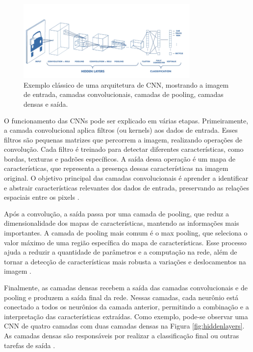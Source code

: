 \begin{figure}[b!]
    \centering   
    \includegraphics[width=0.8\textwidth]{fig/CNNExample.png}
    \caption{Exemplo clássico de uma arquitetura de CNN, mostrando a imagem de entrada, camadas convolucionais, camadas de pooling, camadas densas e saída.}
    \label{fig:cnnexample}
\end{figure} %


O funcionamento das CNNs pode ser explicado em várias etapas. Primeiramente, a camada convolucional aplica filtros (ou kernels) aos dados de entrada. Esses filtros são pequenas matrizes que percorrem a imagem, realizando operações de convolução. Cada filtro é treinado para detectar diferentes características, como bordas, texturas e padrões específicos. A saída dessa operação é um mapa de características, que representa a presença dessas características na imagem original. O objetivo principal das camadas convolucionais é aprender a identificar e abstrair características relevantes dos dados de entrada, preservando as relações espaciais entre os pixels \cite{aggarwal2018neural}.

Após a convolução, a saída passa por uma camada de pooling, que reduz a dimensionalidade dos mapas de características, mantendo as informações mais importantes. A camada de pooling mais comum é o max pooling, que seleciona o valor máximo de uma região específica do mapa de características. Esse processo ajuda a reduzir a quantidade de parâmetros e a computação na rede, além de tornar a detecção de características mais robusta a variações e deslocamentos na imagem \cite{aggarwal2018neural}.

Finalmente, as camadas densas recebem a saída das camadas convolucionais e de pooling e produzem a saída final da rede. Nessas camadas, cada neurônio está conectado a todos os neurônios da camada anterior, permitindo a combinação e a interpretação das características extraídas. Como exemplo, pode-se observar uma CNN de quatro camadas com duas camadas densas na Figura \ref{fig:hiddenlayers}. As camadas densas são responsáveis por realizar a classificação final ou outras tarefas de saída \cite{nielsen2015neural}.

